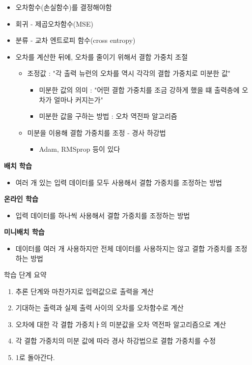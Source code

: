 \documentclass[]{article}
\begin{document}
\begin{itemize}
\item
  오차함수(손실함수)를 결정해야함
\item
  회귀 - 제곱오차함수(MSE)
\item
  분류 - 교차 엔트로피 함수(cross entropy)
\item
  오차를 계산한 뒤에, 오차를 줄이기 위해서 결합 가중치 조절

  \begin{itemize}
  \item
    조정값 : "각 출력 뉴런의 오차를 역시 각각의 결합 가중치로 미분한 값"

    \begin{itemize}
    \item
      미분한 값의 의미 : "어떤 결합 가중치를 조금 강하게 했을 떄
      출력층에 오차가 얼마나 커지는가"
    \item
      미분한 값을 구하는 방법 : 오차 역전파 알고리즘
    \end{itemize}
  \item
    미분을 이용해 결합 가중치를 조정 - 경사 하강법

    \begin{itemize}
    \item
      Adam, RMSprop 등이 있다
    \end{itemize}
  \end{itemize}
\end{itemize}

\textbf{배치 학습}

\begin{itemize}
\item
  여러 개 있는 입력 데이터를 모두 사용해서 결합 가중치를 조정하는 방법
\end{itemize}

\textbf{온라인 학습}

\begin{itemize}
\item
  입력 데이터를 하나씩 사용해서 결합 가중치를 조정하는 방법
\end{itemize}

\textbf{미니배치 학습}

\begin{itemize}
\item
  데이터를 여러 개 사용하지만 전체 데이터를 사용하지는 않고 결합
  가중치를 조정하는 방법
\end{itemize}

학습 단계 요약

\begin{enumerate}
\def\labelenumi{\arabic{enumi}.}
\item
  추론 단계와 마찬가지로 입력값으로 출력을 계산
\item
  기대하는 출력과 실제 출력 사이의 오차를 오차함수로 계산
\item
  오차에 대한 각 결합 가중치ㅏ의 미분값을 오차 역전파 알고리즘으로 계산
\item
  각 결합 가중치의 미분 값에 따라 경사 하강법으로 결합 가중치를 수정
\item
  1로 돌아간다.
\end{enumerate}
\end{document}
